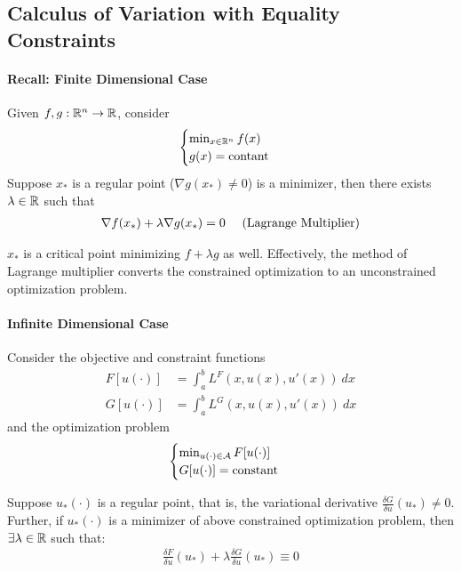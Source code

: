 \documentclass{article}
\begin{document}
	\subsection{Calculus of Variation with Equality Constraints}
	\paragraph{Recall: Finite Dimensional Case} Given $f, g: \mathbb{R}^n \to \mathbb{R}$, consider
	\begin{align}
		\begin{cases}
			\min_{x \in \mathbb{R}^n} f(x) \\
			g(x) = \text{{contant}}
		\end{cases}
	\end{align}
	Suppose $x_*$ is a regular point ($\nabla g(x_*) \neq 0$) is a minimizer, then there exists $\lambda \in \mathbb{R}$ such that
	\begin{align}
		\nabla f(x_*) + \lambda \nabla g(x_*) = 0 \quad \text{{ (Lagrange Multiplier)}}
	\end{align}
	\begin{remark}
		$x_*$ is a critical point minimizing $f + \lambda g$ as well. Effectively, the method of Lagrange multiplier converts the constrained optimization to an unconstrained optimization problem.
	\end{remark}
	
	\paragraph{Infinite Dimensional Case} Consider the objective and constraint functions
	\begin{align}
		F[u(\cdot)] &= \int_a^b L^F(x, u(x), u'(x))\ dx \\
		G[u(\cdot)] &= \int_a^b L^G(x, u(x), u'(x))\ dx
	\end{align}
	and the optimization problem
	\begin{align}
		\begin{cases}
			\min_{u(\cdot) \in \mathcal{{A}}} F[u(\cdot)] \\
			G[u(\cdot)] = \text{{constant}}
		\end{cases}
	\end{align}

	\begin{theorem}
		Suppose $u_*(\cdot)$ is a regular point, that is, the variational derivative $\frac{\delta G}{\delta u}(u_*) \neq 0$.\\
		Further, if $u_*(\cdot)$ is a minimizer of above constrained optimization problem, then $\exists \lambda \in \mathbb{R}$ such that:
		\begin{align}
			\frac{\delta F}{\delta u}(u_*) + \lambda \frac{\delta G}{\delta u}(u_*) \equiv 0
		\end{align}
	\end{theorem}
\end{document}
